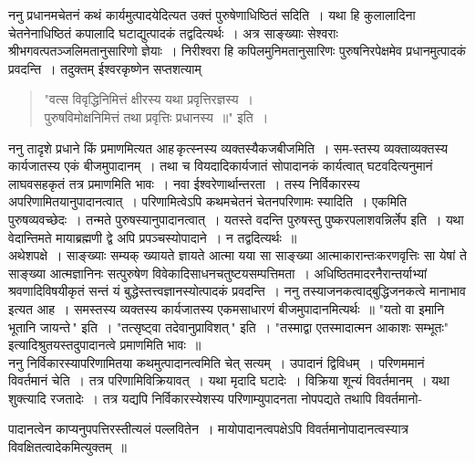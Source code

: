 \documentclass[11pt, openany]{book}
\begin{document}
\vspace{-3mm}
 ननु प्रधानमचेतनं कथं कार्यमुत्पादयेदित्यत उक्तं पुरुषेणाधिष्ठितं 
सदिति~। यथा हि कुलालादिना चेतनेनाधिष्ठितं कपालादि घटाद्युत्पादकं 
तद्वदित्यर्थः~। अत्र साङ्ख्याः सेश्वराः श्रीभगवत्पतञ्जलिमतानुसारिणो
ज्ञेयाः~। निरीश्वरा हि कपिलमुनिमतानुसारिणः पुरुषनिरपेक्षमेव प्रधानमुत्पादकं
प्रवदन्ति~। तदुक्तम् {\qt ईश्वरकृष्णेन सप्तशत्याम्\textendash }

\newpage
\begin{quote}
    {\qt "वत्स विवृद्धिनिमित्तं क्षीरस्य यथा प्रवृत्तिरज्ञस्य~। \\
पुरुषविमोक्षनिमित्तं तथा प्रवृत्तिः प्रधानस्य~॥"} इति~। 
\end{quote}

 ननु तादृशे प्रधाने किं प्रमाणमित्यत आह\textendash \,कृत्स्नस्य
व्यक्तस्यैकजबीजमिति~। सम-स्तस्य व्यक्ताव्यक्तस्य कार्यजातस्य एकं बीजमुपादानम्~। तथा च वियदादिकार्यजातं सोपादानकं कार्यत्वात् घटवदित्यनुमानं लाघवसहकृतं तत्र
प्रमाणमिति भावः~। नवा ईश्वरेणार्थान्तरता~। तस्य निर्विकारस्य
अपरिणामितयानुपादानत्वात्~। परिणामित्वेऽपि कथमचेतनं चेतनपरिणामः स्यादिति~। एकमिति पुरुषव्यवच्छेदः~। तन्मते पुरुषस्यानुपादानत्वात्~। यतस्ते वदन्ति पुरुषस्तु
पुष्करपलाशवन्निर्लेप इति~। यथा वेदान्तिमते मायाब्रह्मणी द्वे अपि
प्रपञ्चस्योपादाने~। न तद्वदित्यर्थः~॥ \\

\vspace{-3mm}
 अथेशपक्षे~। साङ्ख्याः सम्यक् ख्यायते ज्ञायते आत्मा यया सा 
साङ्ख्या आत्माकारान्तःकरणवृत्तिः सा येषां ते साङ्ख्या आत्मज्ञानिनः 
सत्पुरुषेण विवेकादिसाधनचतुष्टयसम्पत्तिमता~। अधिष्ठितमादरनैरान्तर्याभ्यां
श्रवणादिविषयीकृतं सन्तं यं बुद्धेस्तत्त्वज्ञानस्योत्पादकं प्रवदन्ति~।
ननु तस्याजनकत्वाद्बुद्धिजनकत्वे मानाभाव इत्यत आह~। समस्तस्य व्यक्तस्य 
कार्यजातस्य एकमसाधारणं बीजमुपादानमित्यर्थः~॥ {\qt "यतो वा इमानि 
भूतानि जायन्ते\,"}  इति~। {\qt "तत्सृष्ट्वा तदेवानुप्राविशत्\,"} इति~। 
{\qt "तस्माद्वा एतस्मादात्मन आकाशः सम्भूतः"}  इत्यादिश्रुतयस्तदुपादानत्वे 
प्रमाणमिति भावः~॥ \\

\vspace{-3mm}
 ननु निर्विकारस्यापरिणामितया कथमुत्पादानत्वमिति चेत् सत्यम्~। 
उपादानं द्विविधम्~। परिणममानं विवर्तमानं चेति~। तत्र परिणामिविक्रियावत्~।
यथा मृदादि घटादेः~। विक्रिया शून्यं विवर्तमानम्~। यथा शुक्त्यादि रजतादेः~।
तत्र यद्यपि निर्विकारस्येशस्य परिणाम्युपादनता नोपपद्यते तथापि
विवर्तमानो-
\newpage

\noindent पादानत्वेन काप्यनुपपत्तिरस्तीत्यलं पल्लवितेन~। मायोपादानत्वपक्षेऽपि
विवर्तमानोपादानत्वस्यात्र विवक्षितत्वादेकमित्युक्तम्~॥ \\
\end{document}
